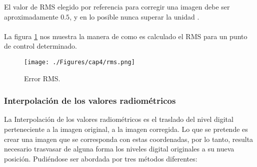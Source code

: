  	El valor de RMS elegido por referencia para corregir una imagen debe ser aproximadamente $ 0.5 $, y en lo posible nunca superar la unidad \cite{guide1999erdas}. \\~\\
 	La figura \ref{fig:rms} nos muestra la manera de como es calculado el RMS para un punto de control determinado.
 
 
     \begin{figure}[H]
     	\centering
     	\texttt{[image: ./Figures/cap4/rms.png]}
     	\caption{Error RMS.}
     	\label{fig:rms}
     \end{figure}



\subsubsection{Interpolaci\'on de los valores radiom\'etricos}
La Interpolaci\'on de los valores radiom\'etricos es el traslado del nivel digital perteneciente a la imagen original, a la imagen corregida. Lo que se pretende es crear una imagen que se corresponda con estas coordenadas, por lo tanto, resulta necesario trasvasar de alguna forma los niveles digital originales a su nueva posici\'on. Pudi\'endose ser abordada por tres m\'etodos diferentes:
